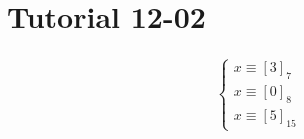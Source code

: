 \documentclass[class=scrartcl, crop=false]{standalone}
\date{2019-12-02}
\begin{document}
\section{Tutorial 12-02}

\begin{example}
  \begin{gather*}
    \begin{cases}
      x \equiv [3]_7 \\
      x \equiv [0]_8 \\
      x \equiv [5]_{15}
    \end{cases} 
  \end{gather*} 
\end{example} 
\end{document}
